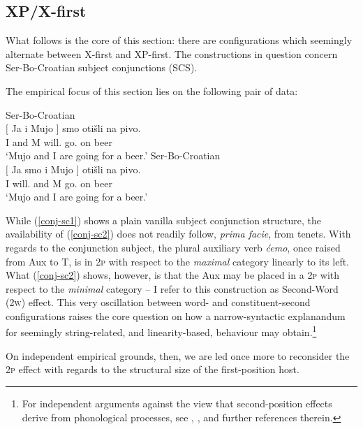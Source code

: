\documentclass[output=paper]{langsci/langscibook}
\begin{document}
\subsection{XP/X-first}\label{subsec:XP-X1}

What follows is the core of this section: there are configurations which
seemingly alternate between X-first and XP-first. The constructions in question
concern Ser-Bo-Croatian subject conjunctions (SCS).

The empirical focus of this section lies on the following pair of data:

\begin{exe}
	\ex Ser-Bo-Croatian\\
    \gll $\big[$ Ja i Mujo $\big]$ smo otišli na pivo.\\
    {} I and M {} will.\Pl{} go.\Ptcp{} on beer \\
	\trans `Mujo and I are going for a beer.'
	\label{conj-sc1}
	\ex Ser-Bo-Croatian\\
	\gll $\big[$ Ja smo i Mujo $\big]$  otišli na pivo.\\
    {} I will.\Pl{} and M {} go.\Ptcp{} on beer \\
	\trans `Mujo and I are going for a beer.'
	\label{conj-sc2}
\end{exe}

While (\ref{conj-sc1}) shows a plain vanilla subject conjunction structure, the
availability of (\ref{conj-sc2}) does not readily follow, \emph{prima facie},
from  tenets.  With regards to the conjunction
subject, the plural auxiliary verb \emph{ćemo}, once raised from
Aux to T, is in \textsc{2p} with
respect to the \emph{maximal} category linearly to its left. What
(\ref{conj-sc2}) shows, however, is that the Aux may be placed in a \textsc{2p}
with respect to the \emph{minimal} category -- I refer to this construction
as Second-Word (\textsc{2w}) effect. This very oscillation between word- and
constituent-second configurations raises the core question on how a
narrow-syntactic explanandum for seemingly string-related, and linearity-based,
behaviour may obtain.\footnote{For independent arguments against the view that
second-position effects derive from phonological processes, see \citet[11--36,
75--93]{Boskovic:2001b}, \citet[Ch. 3]{Roberts2010}, and further references
therein.}

On independent empirical grounds, then, we are led once more to reconsider the
\textsc{2p} effect with regards to the structural size of the
first-po\-si\-tion host.
\end{document}
